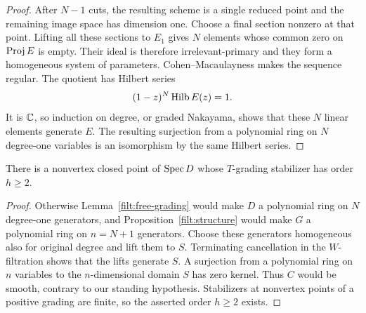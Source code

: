 \begin{proof}
After $N-1$ cuts, the resulting scheme is a single reduced point and
the remaining image space has dimension one.  Choose a final section
nonzero at that point.  Lifting all these sections to $E_1$ gives $N$
elements whose common zero on $\operatorname{Proj} E$ is empty.  Their ideal is
therefore irrelevant-primary and they form a homogeneous system of
parameters.  Cohen--Macaulayness makes the sequence regular.  The
quotient has Hilbert series
\[
 (1-z)^N\operatorname{Hilb} E(z)=1.
\]
It is $\mathbb C$, so induction on degree, or graded Nakayama, shows that
these $N$ linear elements generate $E$.  The resulting surjection from
a polynomial ring on $N$ degree-one variables is an isomorphism by the
same Hilbert series.
\end{proof}

\begin{corollary}\label{filt:stabilizer}
There is a nonvertex closed point of $\operatorname{Spec} D$ whose $T$-grading
stabilizer has order $h\geq2$.
\end{corollary}

\begin{proof}
Otherwise Lemma~\ref{filt:free-grading} would make $D$ a polynomial ring
on $N$ degree-one generators, and Proposition~\ref{filt:structure} would
make $G$ a polynomial ring on $n=N+1$ generators.  Choose these generators
homogeneous also for original degree and lift them to $S$.  Terminating
cancellation in the $W$-filtration shows that the lifts generate $S$.
A surjection from a polynomial ring on $n$ variables to the
$n$-dimensional domain $S$ has zero kernel.  Thus $C$ would be smooth,
contrary to our standing hypothesis.  Stabilizers at nonvertex points
of a positive grading are finite, so the asserted order $h\geq2$
exists.
\end{proof}

